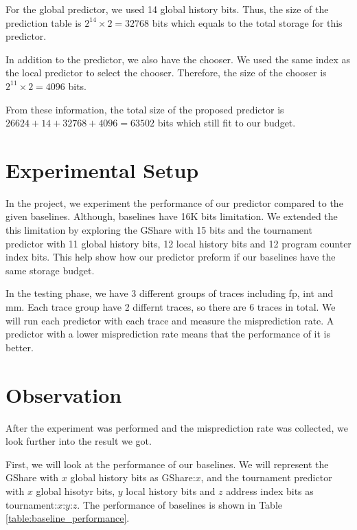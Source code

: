 \documentclass[conference]{IEEEtran}
\begin{document}
For the global predictor, we used 14 global history bits. Thus, the size of the prediction
table is $2^14 \times 2 = 32768$ bits which equals to the total storage for this predictor.

In addition to the predictor, we also have the chooser. We used the same index as the local predictor
to select the chooser. Therefore, the size of the chooser is $2^11 \times 2 = 4096$ bits.

From these information, the total size of the proposed predictor is
$26624 + 14 + 32768 + 4096 = 63502$ bits which still fit to our budget.

\section{Experimental Setup}

In the project, we experiment the performance of our predictor compared to the given baselines.
Although, baselines have 16K bits limitation. We extended the this limitation
by exploring the GShare with 15 bits and the tournament predictor with
11 global history bits, 12 local history bits and 12 program counter index bits.
This help show how our predictor preform if our baselines have the same storage budget.

In the testing phase, we have 3 different groups of traces including fp, int and mm.
Each trace group have 2 differnt traces, so there are 6 traces in total. We will run
each predictor with each trace and measure the misprediction rate. A predictor with a lower misprediction rate
means that the performance of it is better.

\section{Observation}

After the experiment was performed and the misprediction rate was collected, we look
further into the result we got.

First, we will look at the performance of our baselines. We will represent the
GShare with $x$ global history bits as GShare:$x$, and the tournament predictor
with $x$ global hisotyr bits, $y$ local history bits and $z$ address index bits
as tournament:$x$:$y$:$z$. The performance of baselines is shown in Table \ref{table:baseline_performance}.
\end{document}
